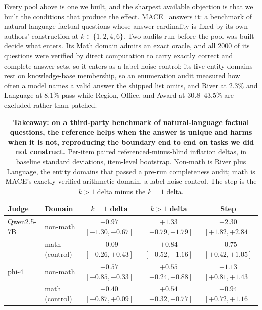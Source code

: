 \documentclass[11pt]{article}
\begin{document}
Every pool above is one we built, and the sharpest available objection is that we built the conditions that produce the effect.
\textsc{MACE}~\cite{mace2026} answers it: a benchmark of natural-language factual questions whose answer cardinality is fixed by its own authors' construction at $k \in \{1,2,4,6\}$.
Two audits run before the pool was built decide what enters.
Its Math domain admits an exact oracle, and all 2000 of its questions were verified by direct computation to carry exactly correct and complete answer sets, so it enters as a label-noise control; its five entity domains rest on knowledge-base membership, so an enumeration audit measured how often a model names a valid answer the shipped list omits, and River at $2.3\%$ and Language at $8.1\%$ pass while Region, Office, and Award at $30.8$--$43.5\%$ are excluded rather than patched.

\begin{table}[tbp]
\centering
\small
\setlength{\tabcolsep}{5pt}
\begin{tabular}{llccc}
\toprule
Judge & Domain & $k{=}1$ delta & $k{>}1$ delta & Step \\
\midrule
Qwen2.5-7B & non-math & $\mathbf{-0.97}$ {\scriptsize$[-1.30,-0.67]$} & $\mathbf{+1.33}$ {\scriptsize$[+0.79,+1.79]$} & $\mathbf{+2.30}$ {\scriptsize$[+1.82,+2.84]$} \\
 & math (control) & $+0.09$ {\scriptsize$[-0.26,+0.43]$} & $+0.84$ {\scriptsize$[+0.52,+1.16]$} & $+0.75$ {\scriptsize$[+0.42,+1.05]$} \\
\addlinespace
phi-4 & non-math & $\mathbf{-0.57}$ {\scriptsize$[-0.85,-0.33]$} & $\mathbf{+0.55}$ {\scriptsize$[+0.24,+0.88]$} & $\mathbf{+1.13}$ {\scriptsize$[+0.81,+1.43]$} \\
 & math (control) & $-0.40$ {\scriptsize$[-0.87,+0.09]$} & $+0.54$ {\scriptsize$[+0.32,+0.77]$} & $+0.94$ {\scriptsize$[+0.72,+1.16]$} \\
\bottomrule
\end{tabular}
\caption{\textbf{Takeaway: on a third-party benchmark of natural-language factual questions, the reference helps when the answer is unique and harms when it is not, reproducing the boundary end to end on tasks we did not construct.}
Per-item paired referenced-minus-blind inflation deltas, in baseline standard deviations, item-level bootstrap. Non-math is River plus Language, the entity domains that passed a pre-run completeness audit; math is \textsc{MACE}'s exactly-verified arithmetic domain, a label-noise control. The step is the $k{>}1$ delta minus the $k{=}1$ delta.}
\label{tab:mace}
\end{table}
\end{document}
